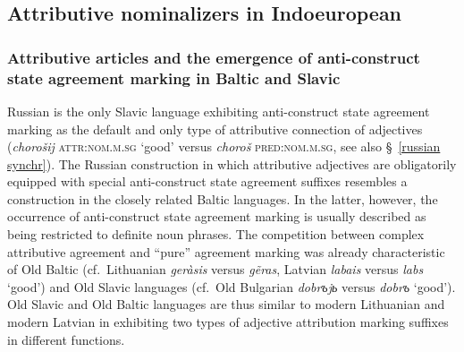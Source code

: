 \subsection{Attributive nominalizers in Indoeuropean} \label{ie diachr}

\subsubsection[Baltic and Slavic]{Attributive articles and the emergence of anti-construct state agreement marking in Baltic and Slavic} \label{slavic diachr}

Russian is the only Slavic language exhibiting anti-construct state agreement marking as the default and only type of attributive connection of adjectives (\textit{chorošij} \textsc{attr:nom.m.sg} ‘good’ versus \textit{choroš} \textsc{pred:nom.m.sg}, see also \S~\ref{russian synchr}). The Russian construction in which attributive adjectives are obligatorily equipped with special anti-construct state agreement suffixes resembles a construction in the closely related Baltic languages. In the latter, however, the occurrence of anti-construct state agreement marking is usually described as being restricted to definite noun phrases. The competition between complex attributive agreement and “pure” agreement marking was  already characteristic of Old Baltic (cf.~Lithuanian \textit{geràsis} versus \textit{g{\~e}ras}, Latvian \textit{labais} versus \textit{labs} ‘good’) and Old Slavic languages (cf.~Old Bulgarian \textit{dobrъjь} versus \textit{dobrъ} ‘good’). Old Slavic and Old Baltic languages are thus similar to modern Lithuanian and modern Latvian in exhibiting two types of adjective attribution marking suffixes in different functions.

